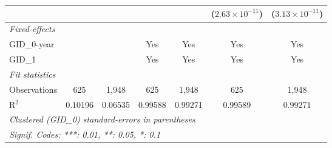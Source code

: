 \begin{table}[H]
\begin{tabular}{lcccccc}
                         &              &                       &                         &                         & ($2.63\times 10^{-11}$)  & ($3.13\times 10^{-11}$)\\    
      \midrule
      \emph{Fixed-effects}\\
      GID\_0-year        &              &                       & Yes                     & Yes                     & Yes                      & Yes\\  
      GID\_1             &              &                       & Yes                     & Yes                     & Yes                      & Yes\\  
      \midrule
      \emph{Fit statistics}\\
      Observations       & 625          & 1,948                 & 625                     & 1,948                   & 625                      & 1,948\\  
      R$^2$              & 0.10196      & 0.06535               & 0.99588                 & 0.99271                 & 0.99589                  & 0.99271\\  
      \midrule \midrule
      \multicolumn{7}{l}{\emph{Clustered (GID\_0) standard-errors in parentheses}}\\
      \multicolumn{7}{l}{\emph{Signif. Codes: ***: 0.01, **: 0.05, *: 0.1}}\\
   \end{tabular}
\end{table}



